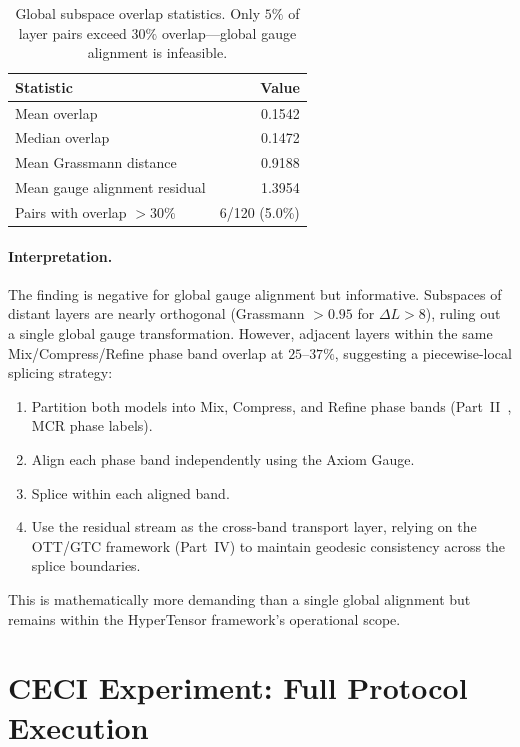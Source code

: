 \documentclass[11pt]{article}
\begin{document}
\begin{table}[h]\centering\small
\caption{Global subspace overlap statistics.  Only $5\%$ of layer
pairs exceed $30\%$ overlap---global gauge alignment is infeasible.}
\label{tab:overlap-global}
\begin{tabular}{@{}lr@{}}
\toprule
Statistic & Value \\
\midrule
Mean overlap & 0.1542 \\
Median overlap & 0.1472 \\
Mean Grassmann distance & 0.9188 \\
Mean gauge alignment residual & 1.3954 \\
Pairs with overlap $>30\%$ & 6/120 (5.0\%) \\
\bottomrule
\end{tabular}
\end{table}

\paragraph{Interpretation.}  The finding is negative for global gauge
alignment but informative.  Subspaces of distant layers are nearly
orthogonal (Grassmann $>0.95$ for $\Delta L > 8$), ruling out a single
global gauge transformation.  However, adjacent layers within the same
Mix/Compress/Refine phase band overlap at $25$--$37\%$, suggesting a
piecewise-local splicing strategy:

\begin{enumerate}
\item Partition both models into Mix, Compress, and Refine phase bands
      (Part~II~\cite{stewart2026gp}, MCR phase labels).
\item Align each phase band independently using the Axiom Gauge.
\item Splice within each aligned band.
\item Use the residual stream as the cross-band transport layer,
      relying on the OTT/GTC framework (Part~IV) to maintain geodesic
      consistency across the splice boundaries.
\end{enumerate}

This is mathematically more demanding than a single global alignment
but remains within the HyperTensor framework's operational scope.

\section{CECI Experiment: Full Protocol Execution}
\label{sec:experiment}
\end{document}
